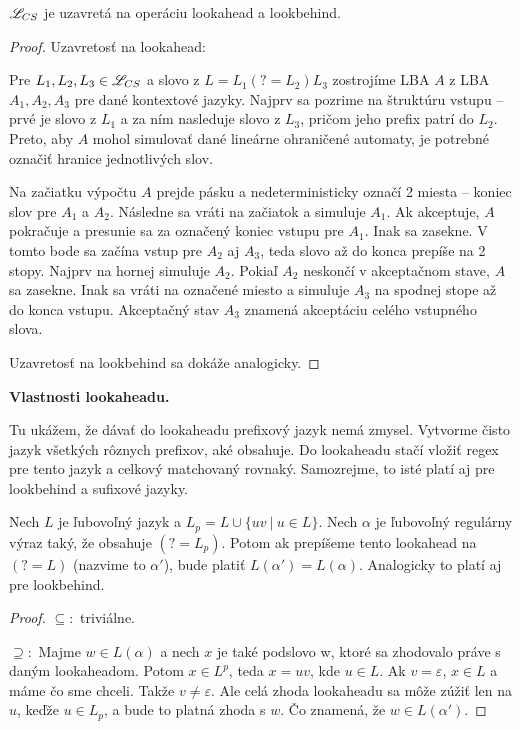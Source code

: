 \begin{veta} \label{CS-lookahead}
$ \mathscr{L}_{CS} $ je uzavretá na operáciu lookahead a lookbehind.
\end{veta} 
\begin{proof}
Uzavretosť na lookahead:

Pre $ L_{1}, L_{2}, L_{3} \in \mathscr{L}_{CS} $ a slovo z $ L = L_{1}(?=L_{2})L_{3} $ zostrojíme LBA $A$ z LBA $A_1, A_2, A_3$ pre dané kontextové jazyky. Najprv sa pozrime na štruktúru vstupu -- prvé je slovo z $L_1$ a za ním nasleduje slovo z $L_3$, pričom jeho prefix patrí do $L_2$. Preto, aby $A$ mohol simulovať dané lineárne ohraničené automaty, je potrebné označiť hranice jednotlivých slov.

 Na začiatku výpočtu $A$ prejde pásku a nedeterministicky označí 2 miesta -- koniec slov pre $A_1$ a $A_2$. Následne sa vráti na začiatok a simuluje $A_1$. Ak akceptuje, $A$ pokračuje a presunie sa za označený koniec vstupu pre $A_1$. Inak sa zasekne. V tomto bode sa začína vstup pre $A_2$ aj $A_3$, teda slovo až do konca prepíše na 2 stopy. Najprv na hornej simuluje $A_2$. Pokiaľ $A_2$ neskončí v akceptačnom stave, $A$ sa zasekne. Inak sa vráti na označené miesto a simuluje $A_3$ na spodnej stope až do konca vstupu. Akceptačný stav $A_3$ znamená akceptáciu celého vstupného slova.

Uzavretosť na lookbehind sa dokáže analogicky.
\end{proof}

\textbf{Vlastnosti lookaheadu.}

Tu ukážem, že dávať do lookaheadu prefixový jazyk nemá zmysel. Vytvorme čisto jazyk všetkých rôznych prefixov, aké obsahuje. Do lookaheadu stačí vložiť regex pre tento jazyk a celkový matchovaný rovnaký. Samozrejme, to isté platí aj pre lookbehind a sufixové jazyky.

\begin{veta}\label{bezprefixove}
Nech $L$ je ľubovoľný jazyk a $L_p = L \cup \lbrace uv ~|~ u \in L \rbrace$. Nech $\alpha$ je ľubovoľný regulárny výraz taký, že obsahuje $(?=L_p)$. Potom ak prepíšeme tento lookahead na $(?=L)$ (nazvime to $\alpha '$), bude platiť $L(\alpha ') = L(\alpha )$. Analogicky to platí aj pre lookbehind.
\end{veta}
\begin{proof}
$\subseteq :$ triviálne.

$\supseteq :$ Majme $w \in L(\alpha)$ a nech $x$ je také podslovo w, ktoré sa zhodovalo práve s daným lookaheadom. Potom $x \in L^p$, teda $x=uv$, kde $u \in L$. Ak $v=\varepsilon$, $x \in L$ a máme čo sme chceli. Takže $v\neq \varepsilon$. Ale celá zhoda lookaheadu sa môže zúžiť len na $u$, keďže $u \in L_p$, a bude to platná zhoda s $w$. Čo znamená, že $w \in L(\alpha ')$.
\end{proof}

